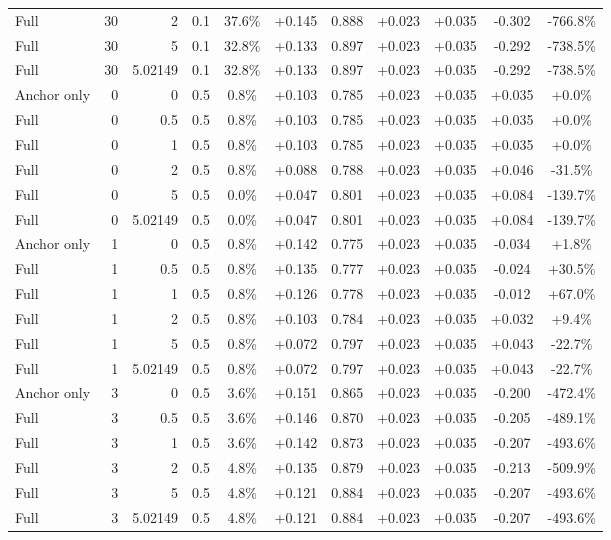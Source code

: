 \begin{table}[htbp]
\begin{tabular}{lrrrccccccc}
Full & 30 & 2 & 0.1 & 37.6\% & +0.145 & 0.888 & +0.023 & +0.035 & -0.302 & -766.8\% \\
Full & 30 & 5 & 0.1 & 32.8\% & +0.133 & 0.897 & +0.023 & +0.035 & -0.292 & -738.5\% \\
Full & 30 & 5.02149 & 0.1 & 32.8\% & +0.133 & 0.897 & +0.023 & +0.035 & -0.292 & -738.5\% \\
Anchor only & 0 & 0 & 0.5 & 0.8\% & +0.103 & 0.785 & +0.023 & +0.035 & +0.035 & +0.0\% \\
Full & 0 & 0.5 & 0.5 & 0.8\% & +0.103 & 0.785 & +0.023 & +0.035 & +0.035 & +0.0\% \\
Full & 0 & 1 & 0.5 & 0.8\% & +0.103 & 0.785 & +0.023 & +0.035 & +0.035 & +0.0\% \\
Full & 0 & 2 & 0.5 & 0.8\% & +0.088 & 0.788 & +0.023 & +0.035 & +0.046 & -31.5\% \\
Full & 0 & 5 & 0.5 & 0.0\% & +0.047 & 0.801 & +0.023 & +0.035 & +0.084 & -139.7\% \\
Full & 0 & 5.02149 & 0.5 & 0.0\% & +0.047 & 0.801 & +0.023 & +0.035 & +0.084 & -139.7\% \\
Anchor only & 1 & 0 & 0.5 & 0.8\% & +0.142 & 0.775 & +0.023 & +0.035 & -0.034 & +1.8\% \\
Full & 1 & 0.5 & 0.5 & 0.8\% & +0.135 & 0.777 & +0.023 & +0.035 & -0.024 & +30.5\% \\
Full & 1 & 1 & 0.5 & 0.8\% & +0.126 & 0.778 & +0.023 & +0.035 & -0.012 & +67.0\% \\
Full & 1 & 2 & 0.5 & 0.8\% & +0.103 & 0.784 & +0.023 & +0.035 & +0.032 & +9.4\% \\
Full & 1 & 5 & 0.5 & 0.8\% & +0.072 & 0.797 & +0.023 & +0.035 & +0.043 & -22.7\% \\
Full & 1 & 5.02149 & 0.5 & 0.8\% & +0.072 & 0.797 & +0.023 & +0.035 & +0.043 & -22.7\% \\
Anchor only & 3 & 0 & 0.5 & 3.6\% & +0.151 & 0.865 & +0.023 & +0.035 & -0.200 & -472.4\% \\
Full & 3 & 0.5 & 0.5 & 3.6\% & +0.146 & 0.870 & +0.023 & +0.035 & -0.205 & -489.1\% \\
Full & 3 & 1 & 0.5 & 3.6\% & +0.142 & 0.873 & +0.023 & +0.035 & -0.207 & -493.6\% \\
Full & 3 & 2 & 0.5 & 4.8\% & +0.135 & 0.879 & +0.023 & +0.035 & -0.213 & -509.9\% \\
Full & 3 & 5 & 0.5 & 4.8\% & +0.121 & 0.884 & +0.023 & +0.035 & -0.207 & -493.6\% \\
Full & 3 & 5.02149 & 0.5 & 4.8\% & +0.121 & 0.884 & +0.023 & +0.035 & -0.207 & -493.6\% \\

\end{tabular}
\end{table}
